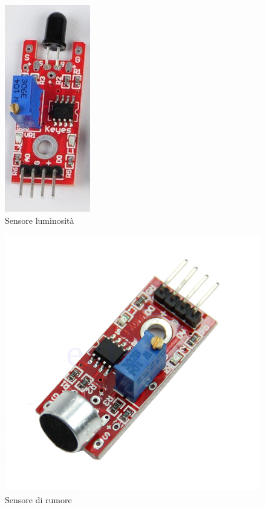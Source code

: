 \documentclass[a4paper,titlepage]{book}
\begin{document}
\begin{figure}[!h]
\centering
\includegraphics[scale=0.6]{lumi.png}
\caption{Sensore luminosità}
\end{figure}


\begin{figure}[!h]
\centering
\includegraphics[scale=0.2]{mic.jpg}
\caption{Sensore di rumore}
\end{figure}


\end{document}
